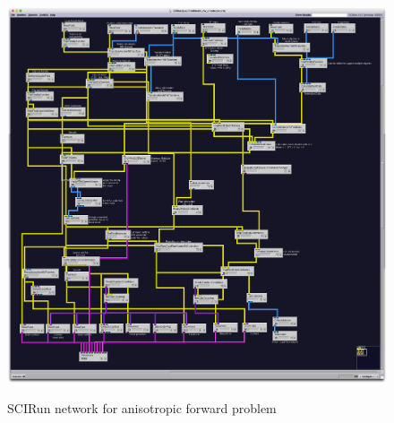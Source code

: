 \begin{figure}[p]
\begin{center}
\includegraphics[width=\textwidth]{Figures/aniso_network.png}\\
\caption{SCIRun network for anisotropic forward problem}
\label{fig:anisofornet}
\end{center}
\end{figure}

